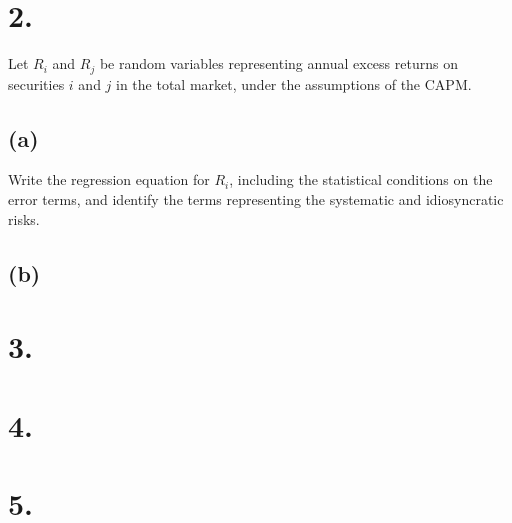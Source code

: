 \documentclass{article}
\begin{document}
\section*{2.}

{\Large

Let $R_i$ and $R_j$ be random variables representing annual excess returns on securities $i$ and $j$ in the total market, under the assumptions of the CAPM.

\subsection*{(a)}

Write the regression equation for $R_i$, including the statistical conditions on the error terms, and identify the terms representing the systematic and idiosyncratic risks.

\subsection*{(b)}

}

\section*{3.}
{\Large 



}

\section*{4.}
{\Large 



}

\section*{5.}
{\Large 



}
\end{document}
